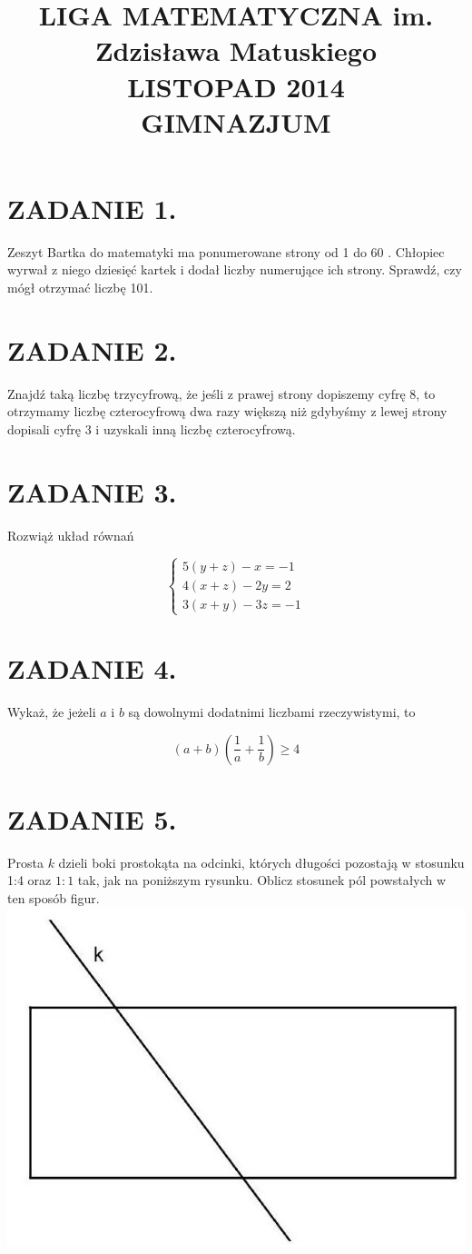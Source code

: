 \documentclass[10pt]{article}
\title{LIGA MATEMATYCZNA im. Zdzisława Matuskiego \\
 LISTOPAD 2014 \\
 GIMNAZJUM }
\author{}
\date{}
\begin{document}
\maketitle
\section*{ZADANIE 1.}
Zeszyt Bartka do matematyki ma ponumerowane strony od 1 do 60 . Chłopiec wyrwał z niego dziesięć kartek i dodał liczby numerujące ich strony. Sprawdź, czy mógł otrzymać liczbę 101.

\section*{ZADANIE 2.}
Znajdź taką liczbę trzycyfrową, że jeśli z prawej strony dopiszemy cyfrę 8, to otrzymamy liczbę czterocyfrową dwa razy większą niż gdybyśmy z lewej strony dopisali cyfrę 3 i uzyskali inną liczbę czterocyfrową.

\section*{ZADANIE 3.}
Rozwiąż układ równań

\[
\left\{\begin{array}{l}
5(y+z)-x=-1 \\
4(x+z)-2 y=2 \\
3(x+y)-3 z=-1
\end{array}\right.
\]

\section*{ZADANIE 4.}
Wykaż, że jeżeli \(a\) i \(b\) są dowolnymi dodatnimi liczbami rzeczywistymi, to

\[
(a+b)\left(\frac{1}{a}+\frac{1}{b}\right) \geq 4
\]

\section*{ZADANIE 5.}
Prosta \(k\) dzieli boki prostokąta na odcinki, których długości pozostają w stosunku 1:4 oraz \(1: 1\) tak, jak na poniższym rysunku. Oblicz stosunek pól powstałych w ten sposób figur.\\
\includegraphics[max width=\textwidth, center]{2024_11_21_51acf29752b622e5581fg-1}
\end{document}
